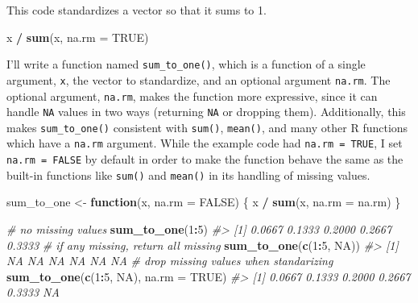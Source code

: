 \documentclass[]{book}
\newenvironment{Shaded}{\begin{snugshade}}{\end{snugshade}}
\newcommand{\CommentTok}[1]{\textcolor[rgb]{0.56,0.35,0.01}{\textit{#1}}}
\newcommand{\ControlFlowTok}[1]{\textcolor[rgb]{0.13,0.29,0.53}{\textbf{#1}}}
\newcommand{\DataTypeTok}[1]{\textcolor[rgb]{0.13,0.29,0.53}{#1}}
\newcommand{\DecValTok}[1]{\textcolor[rgb]{0.00,0.00,0.81}{#1}}
\newcommand{\KeywordTok}[1]{\textcolor[rgb]{0.13,0.29,0.53}{\textbf{#1}}}
\newcommand{\NormalTok}[1]{#1}
\newcommand{\OperatorTok}[1]{\textcolor[rgb]{0.81,0.36,0.00}{\textbf{#1}}}
\newcommand{\OtherTok}[1]{\textcolor[rgb]{0.56,0.35,0.01}{#1}}
\newcommand{\StringTok}[1]{\textcolor[rgb]{0.31,0.60,0.02}{#1}}
\theoremstyle{plain}
\theoremstyle{remark}
\begin{document}
This code standardizes a vector so that it sums to 1.

\begin{Shaded}
\begin{Highlighting}[]
\NormalTok{x }\OperatorTok{/}\StringTok{ }\KeywordTok{sum}\NormalTok{(x, }\DataTypeTok{na.rm =} \OtherTok{TRUE}\NormalTok{)}
\end{Highlighting}
\end{Shaded}

I'll write a function named \texttt{sum\_to\_one()}, which is a function
of a single argument, \texttt{x}, the vector to standardize, and an
optional argument \texttt{na.rm}. The optional argument, \texttt{na.rm},
makes the function more expressive, since it can handle \texttt{NA}
values in two ways (returning \texttt{NA} or dropping them).
Additionally, this makes \texttt{sum\_to\_one()} consistent with
\texttt{sum()}, \texttt{mean()}, and many other R functions which have a
\texttt{na.rm} argument. While the example code had
\texttt{na.rm\ =\ TRUE}, I set \texttt{na.rm\ =\ FALSE} by default in
order to make the function behave the same as the built-in functions
like \texttt{sum()} and \texttt{mean()} in its handling of missing
values.

\begin{Shaded}
\begin{Highlighting}[]
\NormalTok{sum_to_one <-}\StringTok{ }\ControlFlowTok{function}\NormalTok{(x, }\DataTypeTok{na.rm =} \OtherTok{FALSE}\NormalTok{) \{}
\NormalTok{  x }\OperatorTok{/}\StringTok{ }\KeywordTok{sum}\NormalTok{(x, }\DataTypeTok{na.rm =}\NormalTok{ na.rm)}
\NormalTok{\}}
\end{Highlighting}
\end{Shaded}

\begin{Shaded}
\begin{Highlighting}[]
\CommentTok{# no missing values}
\KeywordTok{sum_to_one}\NormalTok{(}\DecValTok{1}\OperatorTok{:}\DecValTok{5}\NormalTok{)}
\CommentTok{#> [1] 0.0667 0.1333 0.2000 0.2667 0.3333}
\CommentTok{# if any missing, return all missing}
\KeywordTok{sum_to_one}\NormalTok{(}\KeywordTok{c}\NormalTok{(}\DecValTok{1}\OperatorTok{:}\DecValTok{5}\NormalTok{, }\OtherTok{NA}\NormalTok{))}
\CommentTok{#> [1] NA NA NA NA NA NA}
\CommentTok{# drop missing values when standarizing}
\KeywordTok{sum_to_one}\NormalTok{(}\KeywordTok{c}\NormalTok{(}\DecValTok{1}\OperatorTok{:}\DecValTok{5}\NormalTok{, }\OtherTok{NA}\NormalTok{), }\DataTypeTok{na.rm =} \OtherTok{TRUE}\NormalTok{)}
\CommentTok{#> [1] 0.0667 0.1333 0.2000 0.2667 0.3333     NA}
\end{Highlighting}
\end{Shaded}
\end{document}
